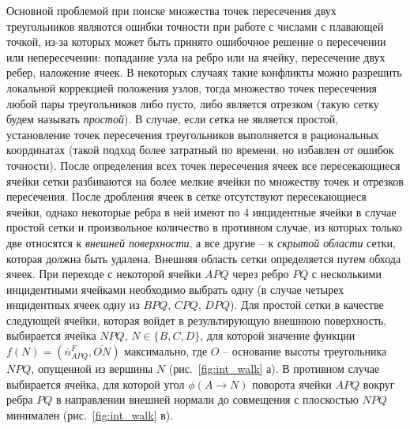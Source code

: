 \documentclass[a4paper,14pt]{extarticle}                     %
\theoremstyle{plain}                                         %
\begin{document}
Основной проблемой при поиске множества точек пересечения двух треугольников являются ошибки точности при работе с числами с плавающей точкой, из-за которых может быть принято ошибочное решение о пересечении или непересечении: попадание узла на ребро или на ячейку, пересечение двух ребер, наложение ячеек.
В некоторых случаях такие конфликты можно разрешить локальной коррекцией положения узлов, тогда множество точек пересечения любой пары треугольников либо пусто, либо является отрезком (такую сетку будем называть \textit{простой}).
В случае, если сетка не является простой, установление точек пересечения треугольников выполняется в рациональных координатах (такой подход более затратный по времени, но избавлен от ошибок точности).
После определения всех точек пересечения ячеек все пересекающиеся ячейки сетки разбиваются на более мелкие ячейки по множеству точек и отрезков пересечения.
После дробления ячеек в сетке отсутствуют пересекающиеся ячейки, однако некоторые ребра в ней имеют по 4 инцидентные ячейки в случае простой сетки и произвольное количество в противном случае, из которых только две относятся к \textit{внешней поверхности}, а все другие -- к \textit{скрытой области} сетки, которая должна быть удалена.
Внешняя область сетки определяется путем обхода ячеек.
При переходе с некоторой ячейки $APQ$ через ребро $PQ$ с несколькими инцидентными ячейками необходимо выбрать одну (в случае четырех инцидентных ячеек одну из $BPQ$, $CPQ$, $DPQ$).
Для простой сетки в качестве следующей ячейки, которая войдет в результирующую внешнюю поверхность, выбирается ячейка $NPQ$, $N \in \{ B, C, D \}$, для которой значение функции $f(N) = (\overline{n}_{APQ}^F, \overline{ON})$ максимально, где $O$ -- основание высоты треугольника $NPQ$, опущенной из вершины $N$ (рис.~\ref{fig:int_walk} а).
В противном случае выбирается ячейка, для которой угол $\phi(A \rightarrow N)$ поворота ячейки $APQ$ вокруг ребра $PQ$ в направлении внешней нормали до совмещения с плоскостью $NPQ$ минимален (рис.~\ref{fig:int_walk} в).
\end{document}
